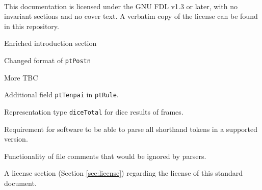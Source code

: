 \documentclass[%
	a4paper%
	,10pt%
	,twoside%
	,notitlepage%
]{article}%
\newcommand*{\github}[1]{\texorpdfstring{\href{https://github.com/#1}{\texttt{#1}}}{#1}}%
\begin{document}
	\paragraph*{}This documentation is licensed under the GNU FDL v1.3 or later, with no invariant sections and no cover text. A verbatim copy of the license can be found in this repository. %
\begin{changelog}[%
	section=true%
	,sectioncmd={\section}%
	,title={Changelog}%
	,label={sec:changelog}%
]%
% 
	\begin{version}[%
		version=\currentVer{}%
		,author={\github{ChemistMikeLam}}%
		,date=\releaseDate{}%
	]%
		\changed{}%
			\item{}Enriched introduction section%
			\item{}Changed format of \lstinline/ptPostn/%
			\item{}More TBC%
	\end{version}%
	\begin{version}[%
		version=1.0.0-β%
		,author={\github{ChemistMikeLam}}%
		,date=Unreleased%
	]%
		\added{}%
			\item{}Additional field \lstinline/ptTenpai/ in \lstinline/ptRule/. %
			\item{}Representation type \lstinline/diceTotal/ for dice results of frames. %
			\item{}Requirement for software to be able to parse all shorthand tokens in a supported version. %
			\item{}Functionality of file comments that would be ignored by parsers. %
			\item{}A license section (Section \ref{sec:license}) regarding the license of this standard document. %

\end{version}
\end{changelog}
\end{document}
